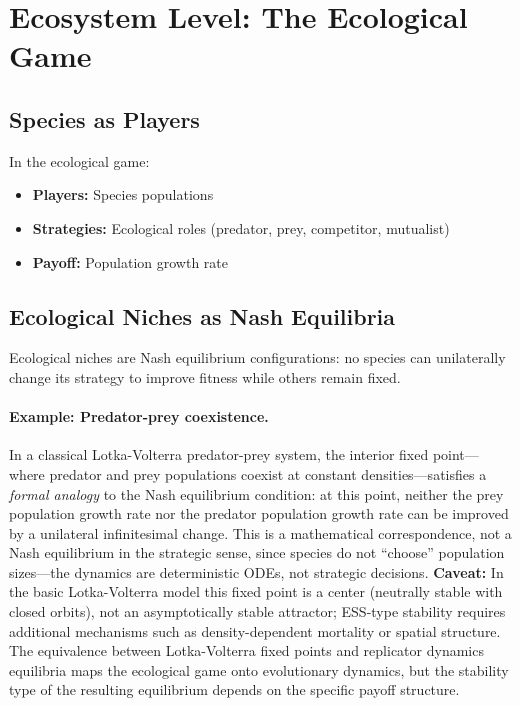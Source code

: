\documentclass[12pt,a4paper]{article}
\theoremstyle{remark}
\begin{document}
\section{Ecosystem Level: The Ecological Game}
\label{sec:ecosystem}

\subsection{Species as Players}

In the ecological game:
\begin{itemize}
    \item \textbf{Players:} Species populations
    \item \textbf{Strategies:} Ecological roles (predator, prey, competitor, mutualist)
    \item \textbf{Payoff:} Population growth rate
\end{itemize}

\subsection{Ecological Niches as Nash Equilibria}

Ecological niches are Nash equilibrium configurations: no species can unilaterally change its strategy to improve fitness while others remain fixed.

\paragraph{Example: Predator-prey coexistence.}
In a classical Lotka-Volterra predator-prey system, the interior fixed point---where predator and prey populations coexist at constant densities---satisfies a \emph{formal analogy} to the Nash equilibrium condition: at this point, neither the prey population growth rate nor the predator population growth rate can be improved by a unilateral infinitesimal change. This is a mathematical correspondence, not a Nash equilibrium in the strategic sense, since species do not ``choose'' population sizes---the dynamics are deterministic ODEs, not strategic decisions. \textbf{Caveat:} In the basic Lotka-Volterra model this fixed point is a center (neutrally stable with closed orbits), not an asymptotically stable attractor; ESS-type stability requires additional mechanisms such as density-dependent mortality or spatial structure. The equivalence between Lotka-Volterra fixed points and replicator dynamics equilibria \citep{HofbauerSigmund1998} maps the ecological game onto evolutionary dynamics, but the stability type of the resulting equilibrium depends on the specific payoff structure.
\end{document}

